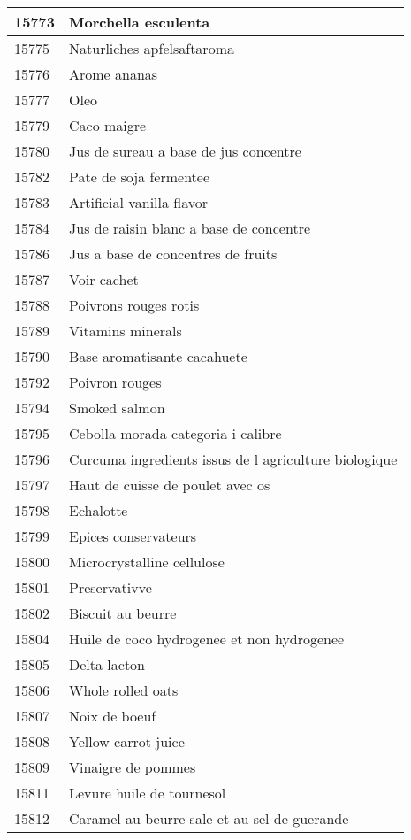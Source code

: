 \begin{longtable}{|l|l|}
15773 & Morchella esculenta \\ \hline 
15775 & Naturliches apfelsaftaroma \\ \hline 
15776 & Arome ananas \\ \hline 
15777 & Oleo \\ \hline 
15779 & Caco maigre \\ \hline 
15780 & Jus de sureau a base de jus concentre \\ \hline 
15782 & Pate de soja fermentee \\ \hline 
15783 & Artificial vanilla flavor \\ \hline 
15784 & Jus de raisin blanc a base de concentre \\ \hline 
15786 & Jus a base de concentres de fruits \\ \hline 
15787 & Voir cachet \\ \hline 
15788 & Poivrons rouges rotis \\ \hline 
15789 & Vitamins minerals \\ \hline 
15790 & Base aromatisante cacahuete \\ \hline 
15792 & Poivron rouges \\ \hline 
15794 & Smoked salmon \\ \hline 
15795 & Cebolla morada categoria i calibre \\ \hline 
15796 & Curcuma  ingredients issus de l agriculture biologique \\ \hline 
15797 & Haut de cuisse de poulet avec os \\ \hline 
15798 & Echalotte \\ \hline 
15799 & Epices conservateurs \\ \hline 
15800 & Microcrystalline cellulose \\ \hline 
15801 & Preservativve \\ \hline 
15802 & Biscuit au beurre \\ \hline 
15804 & Huile de coco hydrogenee et non hydrogenee \\ \hline 
15805 & Delta lacton \\ \hline 
15806 & Whole rolled oats \\ \hline 
15807 & Noix de boeuf \\ \hline 
15808 & Yellow carrot juice \\ \hline 
15809 & Vinaigre de pommes \\ \hline 
15811 & Levure huile de tournesol \\ \hline 
15812 & Caramel au beurre sale et au sel de guerande \\ \hline 

\end{longtable}
